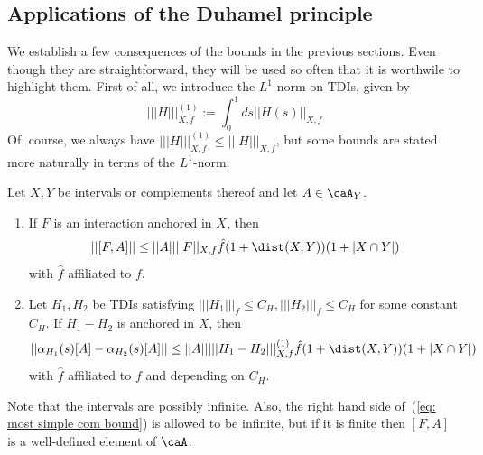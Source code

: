 \subsection{Applications of the Duhamel principle}

We establish a few consequences of the bounds in the previous sections. Even though they are straightforward, they will be used so often that it is worthwile to highlight them. First of all, we introduce the $L^1$ norm on TDIs, given by 
$$
||| H |||^{(1)}_{X,f}:= \int_0^1 ds  || H(s) ||_{X,f}
$$
Of, course, we always have $||| H |||^{(1)}_{X,f}  \leq ||| H |||_{X,f}$, but some bounds are stated more naturally in terms of the $L^1$-norm. 
\begin{lemma} \label{lem: evolution by similar tdi}
	Let $X,Y$ be intervals or complements thereof and let $A\in\caA_Y$.
	\begin{enumerate}
		\item If $F$ is an interaction anchored in $X$, then
		\begin{equation}\label{eq: most simple com bound}
			||[F,A]|| \leq  ||A|| ||F||_{X,f} \hat{f}(1+\dist(X,Y)) (1+|X\cap Y|) 
		\end{equation}
		with $\hat{f}$ affiliated to $f$.
		\item
		Let $H_1,H_2$ be TDIs satisfying $|||H_1|||_f \leq C_H, |||H_2|||_f \leq C_H$ for some constant $C_H$. If $H_1-H_2$ is anchored in $X$, then 
		\begin{equation}\label{eq: duhamel practical}
			||\alpha_{H_1}(s)[A]-\alpha_{H_2}(s) [A] || \leq  ||A|| |||H_1-H_2|||^{(1)}_{X,f} \hat{f}(1+\dist(X,Y)) (1+|X\cap Y|)
		\end{equation}
		with $\hat{f}$ affiliated to $f$ and depending on $C_H$. 
	\end{enumerate}
\end{lemma}
\noindent Note that the intervals are possibly infinite. Also, the right hand side of~(\ref{eq: most simple com bound}) is allowed to be infinite, but if it is finite then $[F,A]$ is a well-defined element of $\caA$.
